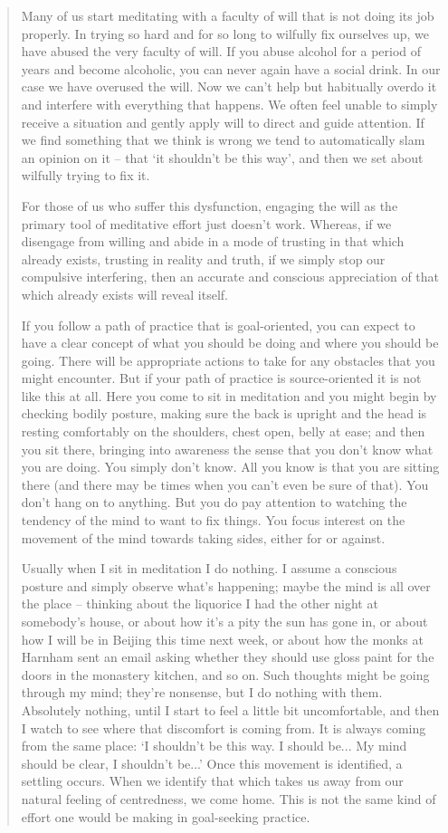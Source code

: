 \begin{quote}
Many of us start meditating with a faculty of will that is not doing its
job properly. In trying so hard and for so long to wilfully fix
ourselves up, we have abused the very faculty of will. If you abuse
alcohol for a period of years and become alcoholic, you can never again
have a social drink. In our case we have overused the will. Now we can't
help but habitually overdo it and interfere with everything that
happens. We often feel unable to simply receive a situation and gently
apply will to direct and guide attention. If we find something that we
think is wrong we tend to automatically slam an opinion on it -- that
`it shouldn't be this way', and then we set about wilfully trying to fix
it.

For those of us who suffer this dysfunction, engaging the will as the
primary tool of meditative effort just doesn't work. Whereas, if we
disengage from willing and abide in a mode of trusting in that which
already exists, trusting in reality and truth, if we simply stop our
compulsive interfering, then an accurate and conscious appreciation of
that which already exists will reveal itself.

If you follow a path of practice that is goal-oriented, you can expect
to have a clear concept of what you should be doing and where you should
be going. There will be appropriate actions to take for any obstacles
that you might encounter. But if your path of practice is
source-oriented it is not like this at all. Here you come to sit in
meditation and you might begin by checking bodily posture, making sure
the back is upright and the head is resting comfortably on the
shoulders, chest open, belly at ease; and then you sit there, bringing
into awareness the sense that you don't know what you are doing. You
simply don't know. All you know is that you are sitting there (and there
may be times when you can't even be sure of that). You don't hang on to
anything. But you do pay attention to watching the tendency of the mind
to want to fix things. You focus interest on the movement of the mind
towards taking sides, either for or against.

Usually when I sit in meditation I do nothing. I assume a conscious
posture and simply observe what's happening; maybe the mind is all over
the place -- thinking about the liquorice I had the other night at
somebody's house, or about how it's a pity the sun has gone in, or about
how I will be in Beijing this time next week, or about how the monks at
Harnham sent an email asking whether they should use gloss paint for the
doors in the monastery kitchen, and so on. Such thoughts might be going
through my mind; they're nonsense, but I do nothing with them.
Absolutely nothing, until I start to feel a little bit uncomfortable,
and then I watch to see where that discomfort is coming from. It is
always coming from the same place: `I shouldn't be this way. I should
be... My mind should be clear, I shouldn't be...' Once this movement is
identified, a settling occurs. When we identify that which takes us away
from our natural feeling of centredness, we come home. This is not the
same kind of effort one would be making in goal-seeking practice.
\end{quote}

